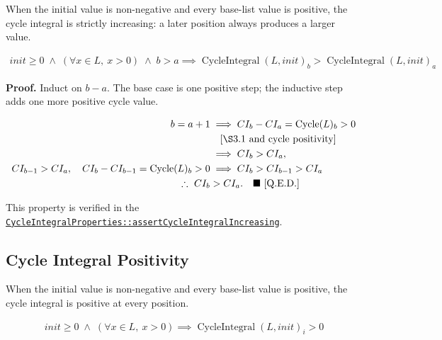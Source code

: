When the initial value is non-negative and every base-list value is
positive, the cycle integral is strictly increasing: a later position
always produces a larger value.

\begin{equation*}
\begin{aligned}
init \geq 0 \;\land\; (\forall x \in L,\ x > 0) \;\land\; b > a \implies
\operatorname{CycleIntegral}(L, init)_b > \operatorname{CycleIntegral}(L, init)_a
\end{aligned}
\end{equation*}

\textbf{Proof.} Induct on $b-a$. The base case is one positive step; the
inductive step adds one more positive cycle value.

\begin{equation*}
\begin{aligned}
b=a+1 &\implies CI_b-CI_a=\operatorname{Cycle}(L)_b>0 \\
      &\quad \text{[\S3.1 and cycle positivity]} \\
       &\implies CI_b>CI_a, \\
CI_{b-1}>CI_a,\quad CI_b-CI_{b-1}=\operatorname{Cycle}(L)_b>0
       &\implies CI_b>CI_{b-1}>CI_a \\
\therefore\ CI_b &> CI_a.
  \quad \blacksquare\ \text{[Q.E.D.]}
\end{aligned}
\end{equation*}

{\raggedright
This property is verified in the
\href{https://github.com/thiagomata/prime-numbers/blob/integral-cycle-article-v1.0.0/src/main/scala/v1/chapter4/cycle/integral/recursive/properties/CycleIntegralProperties.scala}{\texttt{CycleIntegralProperties::\allowbreak assertCycleIntegralIncreasing}}.
\par}

\subsection{Cycle Integral Positivity}

When the initial value is non-negative and every base-list value is
positive, the cycle integral is positive at every position.

\begin{equation*}
\begin{aligned}
init \geq 0 \;\land\; (\forall x \in L,\ x > 0) \implies
\operatorname{CycleIntegral}(L, init)_i > 0
\end{aligned}
\end{equation*}

